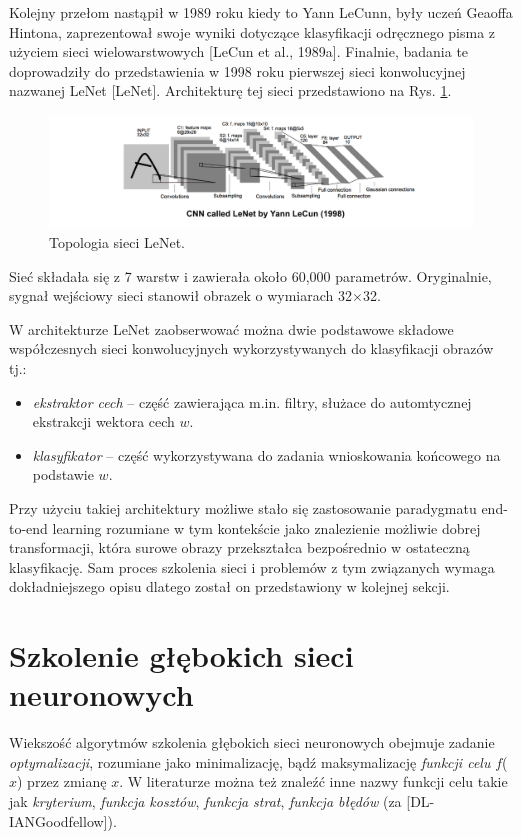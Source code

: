 Kolejny przełom nastąpił w 1989 roku kiedy to Yann LeCunn, były uczeń Geaoffa Hintona, zaprezentował swoje wyniki dotyczące klasyfikacji odręcznego pisma z użyciem sieci wielowarstwowych [LeCun et al., 1989a]. Finalnie, badania te doprowadziły do przedstawienia w 1998 roku pierwszej sieci konwolucyjnej nazwanej LeNet [LeNet]. Architekturę tej sieci przedstawiono na Rys. \ref{LeNet}.
\begin{figure}[h!]
	\centering
	\includegraphics[width=1\textwidth]{figures/lenet.png}
	\caption{Topologia sieci LeNet.}
	\label{LeNet}
\end{figure}

Sieć składała się z 7 warstw i zawierała około 60,000 parametrów. Oryginalnie, sygnał wejściowy sieci stanowił obrazek o wymiarach 32$\times$32.

W architekturze LeNet zaobserwować można dwie podstawowe składowe współczesnych sieci konwolucyjnych wykorzystywanych do klasyfikacji obrazów tj.:
\begin{itemize}
	\item \textit{ekstraktor cech} -- część zawierająca m.in. filtry, służace do automtycznej ekstrakcji wektora cech $w$.
	\item \textit{klasyfikator} -- część wykorzystywana do zadania wnioskowania końcowego na podstawie $w$.
\end{itemize}  

Przy użyciu takiej architektury możliwe stało się zastosowanie paradygmatu end-to-end learning rozumiane w tym kontekście jako znalezienie możliwie dobrej transformacji, która surowe obrazy przekształca bezpośrednio w ostateczną klasyfikację. Sam proces szkolenia sieci i problemów z tym związanych wymaga dokładniejszego opisu dlatego został on przedstawiony w kolejnej sekcji.  

\section{Szkolenie głębokich sieci neuronowych}

Wiekszość algorytmów szkolenia głębokich sieci neuronowych obejmuje zadanie \textit{optymalizacji}, rozumiane jako minimalizację, bądź maksymalizację \textit{funkcji celu} $f$($x$) przez zmianę $x$. W literaturze można też znaleźć inne nazwy funkcji celu takie jak \textit{kryterium}, \textit{funkcja kosztów}, \textit{funkcja strat}, \textit{funkcja błędów} (za [DL-IANGoodfellow]). 

